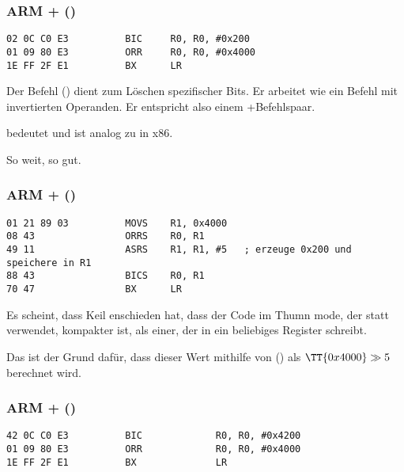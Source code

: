 \subsubsection{ARM + \OptimizingKeilVI (\ARMMode)}

\begin{lstlisting}[caption=\OptimizingKeilVI (\ARMMode),style=customasmARM]
02 0C C0 E3          BIC     R0, R0, #0x200
01 09 80 E3          ORR     R0, R0, #0x4000
1E FF 2F E1          BX      LR
\end{lstlisting}

Der Befehl  () dient zum Löschen spezifischer
Bits. Er arbeitet wie ein \AND Befehl mit invertierten Operanden. Er entspricht
also einem \NOT+\AND Befehlspaar.

 bedeutet  und ist analog zu \OR in x86.

So weit, so gut.

\subsubsection{ARM + \OptimizingKeilVI (\ThumbMode)}

\begin{lstlisting}[caption=\OptimizingKeilVI (\ThumbMode),style=customasmARM]
01 21 89 03          MOVS    R1, 0x4000
08 43                ORRS    R0, R1
49 11                ASRS    R1, R1, #5   ; erzeuge 0x200 und speichere in R1
88 43                BICS    R0, R1
70 47                BX      LR
\end{lstlisting}
Es scheint, dass Keil enschieden hat, dass der Code im Thumn mode, der
 statt  verwendet, kompakter ist, als einer, der 
in ein beliebiges Register schreibt.


Das ist der Grund dafür, dass dieser Wert mithilfe von  (\ASRdesc) als
$\TT{0x4000} \gg 5$ berechnet wird.

\subsubsection{ARM + \OptimizingXcodeIV (\ARMMode)}
\label{anomaly:LLVM}
\myindex{\CompilerAnomaly}

\begin{lstlisting}[caption=\OptimizingXcodeIV (\ARMMode),label=ARM_leaf_example3,style=customasmARM]
42 0C C0 E3          BIC             R0, R0, #0x4200
01 09 80 E3          ORR             R0, R0, #0x4000
1E FF 2F E1          BX              LR
\end{lstlisting}


